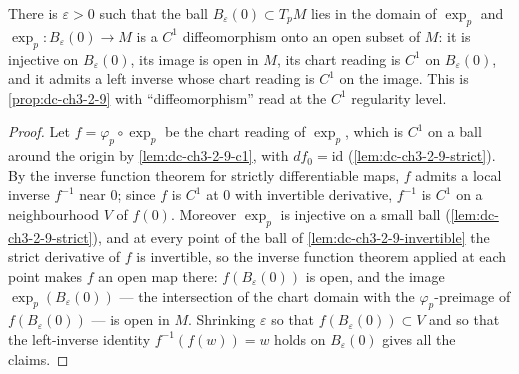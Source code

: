 \begin{lemma}
  \label{lem:dc-ch3-2-9-c1diffeo}
  \leanok
  There is $\varepsilon > 0$ such that the ball
  $B_\varepsilon(0) \subset T_pM$ lies in the domain of $\exp_p$ and
  $\exp_p : B_\varepsilon(0) \to M$ is a $C^1$ diffeomorphism onto an open
  subset of $M$: it is injective on $B_\varepsilon(0)$, its image is open in
  $M$, its chart reading is $C^1$ on $B_\varepsilon(0)$, and it admits a left
  inverse whose chart reading is $C^1$ on the image. This is
  \cref{prop:dc-ch3-2-9} with ``diffeomorphism'' read at the $C^1$ regularity
  level.
\end{lemma}
\begin{proof}
  \sketch
  \leanok
  Let $f = \varphi_p \circ \exp_p$ be the chart reading of $\exp_p$, which is
  $C^1$ on a ball around the origin by \cref{lem:dc-ch3-2-9-c1}, with
  $df_0 = \mathrm{id}$ (\cref{lem:dc-ch3-2-9-strict}). By the inverse function
  theorem for strictly differentiable maps, $f$ admits a local inverse
  $f^{-1}$ near $0$; since $f$ is $C^1$ at $0$ with invertible derivative,
  $f^{-1}$ is $C^1$ on a neighbourhood $V$ of $f(0)$. Moreover $\exp_p$ is
  injective on a small ball (\cref{lem:dc-ch3-2-9-strict}), and at every point
  of the ball of \cref{lem:dc-ch3-2-9-invertible} the strict derivative of $f$
  is invertible, so the inverse function theorem applied at each point makes
  $f$ an open map there: $f(B_\varepsilon(0))$ is open, and the image
  $\exp_p(B_\varepsilon(0))$ — the intersection of the chart domain with the
  $\varphi_p$-preimage of $f(B_\varepsilon(0))$ — is open in $M$. Shrinking
  $\varepsilon$ so that $f(B_\varepsilon(0)) \subset V$ and so that the
  left-inverse identity $f^{-1}(f(w)) = w$ holds on $B_\varepsilon(0)$ gives
  all the claims.
\end{proof}

